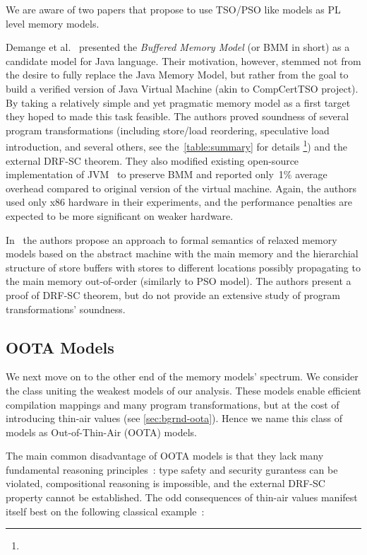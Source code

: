 We are aware of two papers that propose to use TSO/PSO 
like models as PL level memory models.

Demange et al.~\cite{Demange-el:POPL13} presented 
the \emph{Buffered Memory Model} (or BMM in short)
as a candidate model for Java language.
Their motivation, however, stemmed not from the desire 
to fully replace the Java Memory Model, but rather 
from the goal to build a verified version of 
Java Virtual Machine (akin to CompCertTSO project).
By taking a relatively simple and yet pragmatic memory model
as a first target they hoped to made this task feasible. 
The authors proved soundness of several program transformations
(including store/load reordering, speculative load introduction,
and several others, see 
the~\cref{table:summary} for details%
\footnote{})
and the external DRF-SC theorem. 
They also modified existing open-source implementation of 
JVM~\cite{Pizlo-el:ECCS10} to preserve BMM and 
reported only~1\% average overhead 
compared to original version of the virtual machine. 
Again, the authors used only x86 hardware in their 
experiments, and the performance penalties 
are expected to be more significant on weaker hardware.   

In~\cite{Boudol-el:POPL09} the authors propose 
an approach to formal semantics of relaxed memory models 
based on the abstract machine with the main memory 
and the hierarchial structure of store buffers 
with stores to different locations possibly 
propagating to the main memory out-of-order
(similarly to PSO model).
The authors present a proof of DRF-SC theorem,
but do not provide an extensive study 
of program transformations' soundness.

\subsection{OOTA Models}

We next move on to the other end of the memory models' spectrum. 
We consider the class uniting the weakest models of our analysis.
These models enable efficient compilation mappings and 
many program transformations, but at the cost of 
introducing thin-air values (see \cref{sec:bgrnd-oota}).
Hence we name this class of models as Out-of-Thin-Air (OOTA) models. 
 
The main common disadvantage of OOTA models is that 
they lack many fundamental reasoning 
principles~\cite{Boehm-Demsky:MSPC14, Batty-al:ESOP15}:
type safety and security gurantess can be violated, 
compositional reasoning is impossible, and
the external DRF-SC property cannot be established. 
The odd consequences of thin-air values manifest 
itself best on the following classical example~\cite{Boehm-Demsky:MSPC14}: 

